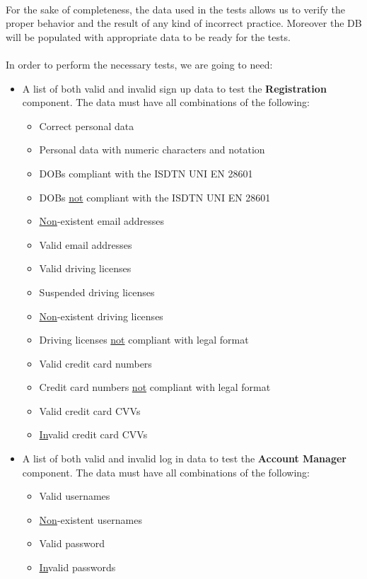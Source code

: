 \documentclass[english]{article}
\begin{document}
 \paragraph{}
 For the sake of completeness, the data used in the tests allows us to verify the proper behavior and the result of any kind of incorrect practice. Moreover the DB will be populated with appropriate data to be ready for the tests.
 
 \paragraph{}
 In order to perform the necessary tests, we are going to need:
 
 \begin{itemize}
   \item{A list of both valid and invalid sign up data to test the \textbf{Registration} component.
   The data must have all combinations of the following:
     \begin{itemize}
       \item{Correct personal data}
       \item{Personal data with numeric characters and notation}
       \item{DOBs compliant with the ISDTN UNI EN 28601}
       \item{DOBs \underline{not} compliant with the ISDTN UNI EN 28601}
       \item{\underline{Non}-existent email addresses}
       \item{Valid email addresses}
       \item{Valid driving licenses}
       \item{Suspended driving licenses}
       \item{\underline{Non}-existent driving licenses}
       \item{Driving licenses \underline{not} compliant with legal format}
       \item{Valid credit card numbers}
       \item{Credit card numbers \underline{not} compliant with legal format}
       \item{Valid credit card CVVs}
       \item{\underline{In}valid credit card CVVs}
     \end{itemize}}
 
     \item{A list of both valid and invalid log in data to test the \textbf{Account Manager} component.
   The data must have all combinations of the following:
     \begin{itemize}
       \item{Valid usernames}
       \item{\underline{Non}-existent usernames}
       \item{Valid password}
       \item{\underline{In}valid passwords}
     \end{itemize}}
 

\end{itemize}
\end{document}
